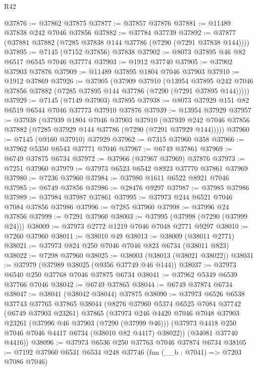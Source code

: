 \begin{lexlean}{R42}
\begin{coremodule}
{@37876 := @37862 @37875
@37877 := @37857 @37876
@37881 := @11489 @37838 @242 @7046 @37856
@37882 := @37784 @37739
@37892 := @37877 (@37881 @37882 (@7285 @37838 @144 @37786 (@7290 (@7291 @37838 @144))))
@37895 := @7145 (@7152 @37856) @37838
@37902 := @8073 @37895 @46 @82 @6517 @6545 @7046 @37774
@37903 := @1912 @37740
@37905 := @37902 @37903 @37876
@37909 := @11489 @37895 @1804 @7046 @37903
@37910 := @1912 @37869
@37926 := @37905
    (@37909
      @37910
      (@13954
        @37895
        @242
        @7046
        @37856
        @37882
        (@7285 @37895 @144 @37786 (@7290 (@7291 @37895 @144)))))
@37929 := @7145 (@7149 @37903) @37895
@37938 := @8073 @37929 @151 @82 @6519 @6544 @7046 @37773 @37910 @37876
@37939 := @13954 @37929
@37957 := @37938
    (@37939
      @1804
      @7046
      @37903
      @37910
      (@37939 @242 @7046 @37856 @37882 (@7285 @37929 @144 @37786 (@7290 (@7291 @37929 @144)))))
@37960 := @7145 (@9160 @37910) @37929
@37962 := @7315 @37960 @358
@37966 := @37962 @5350 @6543 @37771 @7046
@37967 := @6749 @37861
@37969 := @6749 @37875 @6734
@37972 := @37966 (@37967 @37969) @37876
@37973 := @7251 @37960
@37979 := @37973 @6523 @6542 @8923 @37770 @37861 @37969
@37980 := @7236 @37960
@37984 := @37980 @1611 @6522 @8921 @7046
@37985 := @6749 @37856
@37986 := @28476 @9297
@37987 := @37985 @37986
@37989 := @37984 @37987 @37861
@37995 := @37973 @244 @6521 @7046 @7084 @37856 @37986
@37996 := @7285 @37960
@37998 := @37996 @24 @37856
@37999 := @7291 @37960
@38003 := @37995 (@37998 (@7290 (@37999 @24)))
@38009 := @37973 @2772 @1219 @7046 @7048 @2771 @9297
@38010 := @7260 @37960
@38011 := @38010 @49
@38013 := @38009 (@38011 @2771)
@38021 := @37973 @824 @250 @7046 @7046 @823 @6734 (@38011 @823)
@38022 := @7298 @37960
@38025 := @38003 (@38013 (@38021 @38022))
@38031 := @37979 (@37989 @38025 (@9356 @37749 @46 @144))
@38037 := @37973 @6540 @250 @37768 @7046 @37875 @6734
@38041 := @37962 @5349 @6539 @37766 @7046
@38042 := @6749 @37865
@38044 := @6749 @37874 @6734
@38047 := @38041 (@38042 @38044) @37875
@38090 := @37973
    @6526
    @6538
    @37743
    @37765
    @37865
    @38044
    (@8276
      @37960
      @5374
      @6525
      @7084
      @37742
      (@6749 @37903 @23261)
      @37865
      (@37973
        @246
        @4420
        @7046
        @7048
        @37903
        @23261
        (@37996 @46 @37903 (@7290 (@37999 @46)))
        (@37973 @4418 @250 @7046 @7046 @4417 @6734 (@38010 @82 @4417) @38022))
      (@34081 @37740 @4416))
@38096 := @37973 @6536 @250 @37763 @7046 @37874 @6734
@38105 := @7192 @37960 @6531 @6534 @248 @37746 (fun (__b : @7041) => @7203 @7086 @7046)
}
\end{coremodule}
\end{lexlean}
